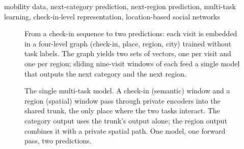 \documentclass[conference]{IEEEtran}
\begin{document}
\begin{IEEEkeywords}
mobility data, next-category prediction, next-region prediction, multi-task
learning, check-in-level representation, location-based social networks
\end{IEEEkeywords}




\begin{figure}[!t]\centering
\resizebox{0.66\textwidth}{!}{}
\caption{From a check-in sequence to two predictions: each visit is embedded in a four-level graph
(check-in, place, region, city) trained without task labels. The graph yields two sets of
vectors, one per visit and one per region; sliding nine-visit windows of each feed a single
model that outputs the next category and the next region.}
\label{fig:dataflow}
\end{figure}     %




\begin{figure}[!t]\centering
\resizebox{\columnwidth}{!}{}
\caption{The single multi-task model. A check-in (semantic) window and a region (spatial) window
pass through private encoders into the shared trunk, the only place where the two tasks
interact. The category output uses the trunk's output alone; the region output
combines it with a private spatial path. One model, one forward pass, two predictions.}
\label{fig:model}
\end{figure}        %




\end{document}
